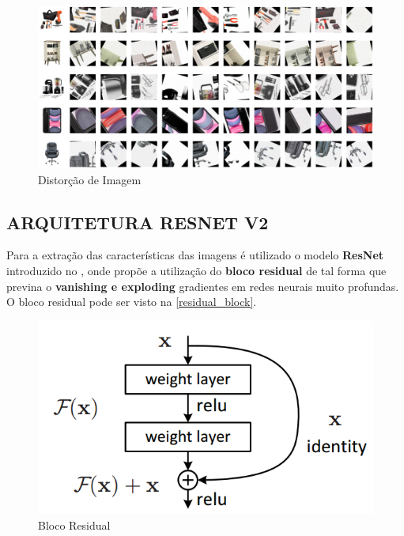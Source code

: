 \begin{figure}[htb]
	\caption{\label{imagem_distorcao} Distorção de Imagem}
	\begin{center}
	    \includegraphics[width=\textwidth]{artigo/recursos/imagens/imagem_distorcao.png}
	\end{center}
\end{figure}

\subsection{ARQUITETURA RESNET V2}

Para a extração das características das imagens é utilizado o modelo \textbf{ResNet} introduzido no \cite{resnet}, onde propõe a utilização do \textbf{bloco residual} de tal forma que previna o \textbf{vanishing e exploding} gradientes em redes neurais muito profundas. O bloco residual pode ser visto na \autoref{residual_block}.

\begin{figure}[htb]
	\caption{\label{residual_block} Bloco Residual}
	\begin{center}
	    \includegraphics[scale=0.4]{artigo/recursos/imagens/residual_block.png}
	\end{center}
\end{figure}

